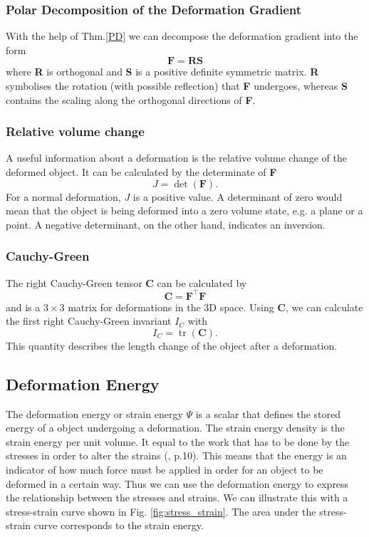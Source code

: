 \subsubsection{Polar Decomposition of the Deformation Gradient}
With the help of Thm.\ref{PD} we can decompose the deformation gradient into the form
\begin{equation}\label{PD_DG}
	\mathbf{F} = \mathbf{RS}
\end{equation}
where \textbf{R} is orthogonal and \textbf{S} is a positive definite symmetric matrix. \textbf{R} symbolises the rotation (with possible reflection) that \textbf{F} undergoes, whereas \textbf{S} contains the scaling along the orthogonal directions of \textbf{F}.

\subsubsection{Relative volume change}
A useful information about a deformation is the relative volume change of the deformed object. It can be calculated by the determinate of \textbf{F}
\begin{equation}\label{det_DG}
	J = \operatorname{det}(\mathbf{F}).
\end{equation}
For a normal deformation, $J$ is a positive value. A determinant of zero would mean that the object is being deformed into a zero volume state, e.g. a plane or a point. A negative determinant, on the other hand, indicates an inversion.


\subsubsection{Cauchy-Green}
The right Cauchy-Green tensor \textbf{C} can be calculated by 
\begin{equation}\label{CG_DG}
	\mathbf{C} = \mathbf{F^\intercal F}
\end{equation}
and is a $3 \times 3$ matrix for deformations in the 3D space. Using \textbf{C}, we can calculate the first right Cauchy-Green invariant $I_C$ with
\begin{equation} \label{tr_CG_DG}
	I_C = \operatorname{tr}(\mathbf{C}).
\end{equation}
This quantity describes the length change of the object after a deformation.

\subsection{Deformation Energy}
The deformation energy or strain energy $\Psi$ is a scalar that defines the stored energy of a object undergoing a deformation. The strain energy density is the strain energy per unit volume. It equal to the work that has to be done by the stresses in order to alter the strains (\cite{KORSUNSKY20175}, p.10). This means that the energy is an indicator of how much force must be applied in order for an object to be deformed in a certain way. Thus we can use the deformation energy to express the relationship between the stresses and strains. We can illustrate this with a stress-strain curve shown in Fig. \ref{fig:stress_strain}. The area under the stress-strain curve corresponds to the strain energy.

